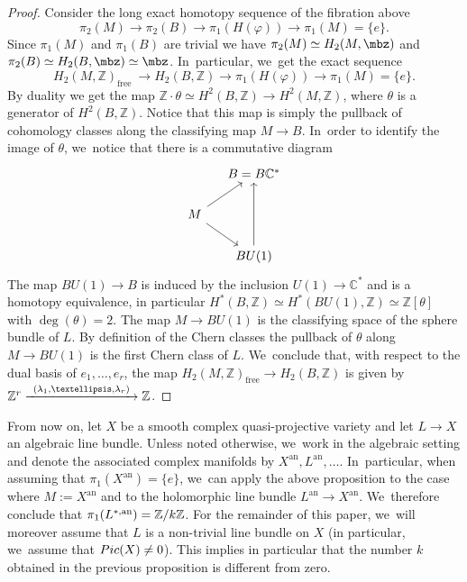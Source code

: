 \documentclass[11pt]{article}
\providecommand{\dpl}{\displaystyle}
\newcommand{\To}[1]{\mathchoice{\xrightarrow{\textstyle\kern4pt#1\kern3pt}}{\xrightarrow{\,#1\,}}{}{}}
\let\ra\rightarrow
\begin{document}
\begin{proof}
Consider the long exact homotopy sequence of the fibration above
\[
\pi_2(M) \to \pi_2(B) \to \pi_1(H(\varphi)) \to \pi_1(M)= \{e\}.
\]
Since $\pi_1(M)$ and $\pi_1(B)$ are trivial we have $\pi_2(M) \simeq H_2(M,\mbz)$ and $\pi_2(B) \simeq H_2(B,\mbz) \simeq \mbz$. In~particular, we~get the exact sequence
\[
H_2(M,\mathbb{Z})_{\text{free}}\ \to H_2(B,\mathbb{Z}) \to \pi_1(H(\varphi)) \to \pi_1(M) = \{e\}.
\]
By duality we get the map $\mathbb{Z} \cdot \theta \simeq H^2(B,\mathbb{Z}) \ra H^2(M,\mathbb{Z})$, where $\theta$ is a generator of $H^2(B,\mathbb{Z})$. Notice that this map is simply the pullback of cohomology classes along the classifying map $M \ra B$. In~order to identify the image of $\theta$, we~notice that there is a commutative diagram
\[
\begin{tikzcd}[column sep=small]
& B = B\mathbb{C}^* \\
M \arrow[ur] \arrow[dr] & \\
& BU(1) \arrow[uu]
\end{tikzcd}
\]
The map $BU(1) \to B$ is induced by the inclusion $U(1) \to \mathbb{C}^*$ and is a homotopy equivalence, in particular $H^*(B, \mathbb{Z}) \simeq H^*(BU(1),\mathbb{Z}) \simeq \mathbb{Z}[\theta]$ with $\deg(\theta) = 2$. The map $M \to BU(1)$ is the classifying space of the sphere bundle of $L$. By definition of the Chern classes the pullback of $\theta$ along $M \to BU(1)$ is the first Chern class of $L$. We~conclude that, with respect to the dual basis of $e_1,\ldots, e_r$, the map $H_2(M,\mathbb{Z})_{\text{free}} \to H_2(B,\mathbb{Z})$ is given by $\mathbb{Z}^r \dpl\To{\scriptstyle(\lambda_1, \ldots, \lambda_r)} \mathbb{Z}$.
\end{proof}

From now on, let $X$ be a smooth complex quasi-projective variety and let $L \to X$ an algebraic line bundle. Unless noted otherwise, we~work in the algebraic setting and denote the associated complex manifolds by $X^\mathrm{an}, L^\mathrm{an},\dots$. In~particular, when assuming that $\pi_1(X^\mathrm{an})=\{e\}$, we~can apply the above proposition to the case where $M:=X^\mathrm{an}$ and to the holomorphic line bundle $L^\mathrm{an}\to X^\mathrm{an}$. We~therefore conclude that $\pi_1(L^{*,\mathrm{an}})={\mathbb Z}/k{\mathbb Z}$. For the remainder of this paper, we~will moreover assume that $L$ is a non-trivial line bundle on $X$ (in particular, we~assume that $\textup{Pic}(X)\neq 0$). This implies in particular that the number $k$ obtained in the previous proposition is different from zero.
\end{document}
